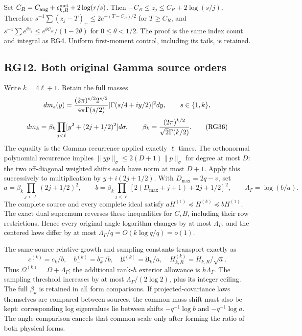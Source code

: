 \documentclass[11pt]{article}
\begin{document}
Set \(C_R=C_{\rm ang}+\epsilon_{k,R}^{\rm met}+2\log(r/s)\). Then \(-C_R\le z_j\le C_R+2\log(s/j)\). Therefore \(s^{-1}\sum(z_j-T)_+\le2e^{-(T-C_R)/2}\) for \(T\ge C_R\), and \(s^{-1}\sum e^{\theta z_j}\le e^{\theta C_R}/(1-2\theta)\) for \(0\le\theta<1/2\). The proof is the same index count and integral as RG4. Uniform first-moment control, including its tails, is retained.

\subsection{RG12. Both original Gamma source orders}\label{rg12.-both-original-gamma-source-orders}

Write \(k=4\ell+1\). Retain the full masses \[
dm_s(y)={(2\pi)^{s/2}2^{s/2}\over4\pi\Gamma(s/2)}
|\Gamma(s/4+iy/2)|^2dy,\qquad s\in\{1,k\},
\] \[
dm_k=\beta_k\prod_{j<\ell}[y^2+(2j+1/2)^2]d\sigma,\qquad
\beta_k={(2\pi)^{k/2}\over\sqrt2\Gamma(k/2)}.
\tag{RG36}
\] The equality is the Gamma recurrence applied exactly \(\ell\) times. The orthonormal polynomial recurrence implies \(\|yp\|_\sigma\le2(D+1)\|p\|_\sigma\) for degree at most \(D\): the two off-diagonal weighted shifts each have norm at most \(D+1\). Apply this successively to multiplication by \(y+i(2j+1/2)\). With \(D_{\max}=2q-v\), set \[
a=\beta_k\prod_{j<\ell}(2j+1/2)^2,\qquad
b=\beta_k\prod_{j<\ell}[2(D_{\max}+j+1)+2j+1/2]^2,\qquad
\Lambda_\Gamma=\log(b/a).
\tag{RG37}
\] The complete source and every complete ideal satisfy \(aH^{(1)}\preceq H^{(k)}\preceq bH^{(1)}\). The exact dual supremum reverses these inequalities for \(C,B\), including their row restrictions. Hence every original angle logarithm changes by at most \(\Lambda_\Gamma\), and the centered laws differ by at most \(\Lambda_\Gamma/q=O(k\log q/q)=o(1)\).

The same-source relative-growth and sampling constants transport exactly as \[
c^{(k)}=c_k/b,\quad b_-^{(k)}=b_k^-/b,\quad
\mathfrak U^{(k)}=\mathfrak U_k/a,\quad H_{k,R}^{(k)}=H_{k,R}/\sqrt a.
\tag{RG38}
\] Thus \(\Omega^{(k)}=\Omega+\Lambda_\Gamma\); the additional rank-\(h\) exterior allowance is \(h\Lambda_\Gamma\). The sampling threshold increases by at most \(\Lambda_\Gamma/(2\log2)\), plus its integer ceiling. The full \(\beta_k\) is retained in all form comparisons. If projected-covariance laws themselves are compared between sources, the common mass shift must also be kept: corresponding log eigenvalues lie between shifts \(-q^{-1}\log b\) and \(-q^{-1}\log a\). The angle comparison cancels that common scale only after forming the ratio of both physical forms.
\end{document}
